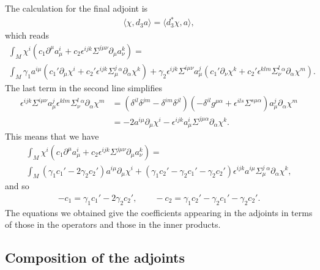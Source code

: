 \documentclass[10pt]{report}
\theoremstyle{definition}
\begin{document}
The calculation for the final adjoint is
\begin{align}
\langle \chi, d_3 a\rangle = \langle d_3^* \chi, a\rangle,
\end{align}
which reads
\begin{align}
\int_M  \chi^i (c_1 \partial^\mu a_\mu^i + c_2 \epsilon^{ijk} \Sigma^{j\mu\nu} \partial_\mu a_\nu^k ) =\\ \nonumber \int_M 
\gamma_1 a^{i\mu} (c_1' \partial_\mu \chi^i + c_2' \epsilon^{ijk} \Sigma^j_\mu{}^\alpha \partial_\alpha \chi^k) + \gamma_2 \epsilon^{ijk} \Sigma^{i\mu\nu} a_\mu^j (c_1' \partial_\nu \chi^k + c_2' \epsilon^{klm} \Sigma^l_\nu{}^\alpha \partial_\alpha \chi^m).
\end{align}
The last term in the second line simplifies
\begin{align}
\epsilon^{ijk} \Sigma^{i\mu\nu} a_\mu^j \epsilon^{klm} \Sigma^l_\nu{}^\alpha \partial_\alpha \chi^m & = ( \delta^{il} \delta^{jm} - \delta^{im}\delta^{jl}) (-\delta^{il} g^{\mu\alpha} + \epsilon^{ils}\Sigma^{s\mu\alpha}) a_\mu^j \partial_\alpha \chi^m \\ \nonumber & = 
- 2 a^{i\mu} \partial_\mu \chi^i - \epsilon^{ijk} a_\mu^i \Sigma^{j\mu\alpha}  \partial_\alpha\chi^k.
\end{align}
This means that we have
\begin{align}
\int_M \chi^i (c_1 \partial^\mu a_\mu^i + c_2 \epsilon^{ijk} \Sigma^{j\mu\nu} \partial_\mu a_\nu^k ) =\\ \nonumber \int_M 
(\gamma_1 c_1' - 2 \gamma_2 c_2' ) a^{i\mu}  \partial_\mu \chi^i + (\gamma_1 c_2'  - \gamma_2 c_1' - \gamma_2 c_2' ) \epsilon^{ijk} a^{i\mu} \Sigma^j_\mu{}^\alpha \partial_\alpha \chi^k ,
\end{align}
and so
\begin{align}\label{c-prime}
- c_1 = \gamma_1 c_1' - 2 \gamma_2 c_2' , \qquad - c_2 = \gamma_1 c_2'  - \gamma_2 c_1' - \gamma_2 c_2' .
\end{align}
The equations we obtained give the coefficients appearing in the adjoints in terms of those in the operators and those in the inner products. 

\subsection{Composition of the adjoints}
\end{document}
